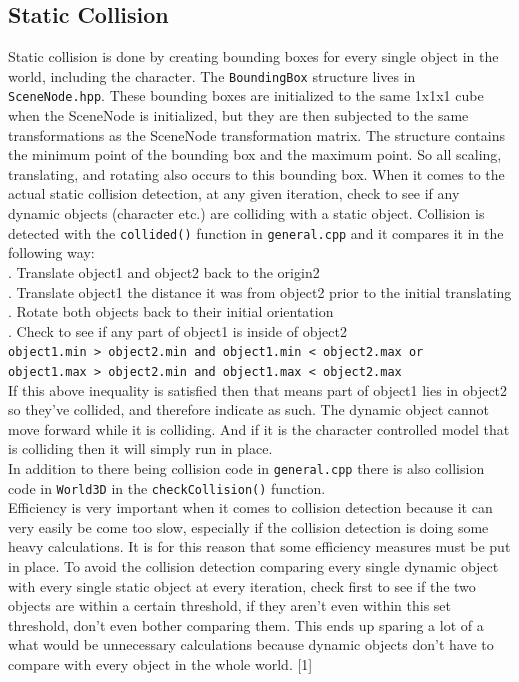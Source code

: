 \documentclass {article}
\begin{document}
\subsection{Static Collision}
Static collision is done by creating bounding boxes for every single object in the world, including the character. The \texttt{BoundingBox} structure lives in \texttt{SceneNode.hpp}. These bounding boxes are initialized to the same 1x1x1 cube when the SceneNode is initialized, but they are then subjected to the same transformations as the SceneNode transformation matrix. The structure contains the minimum point of the bounding box and the maximum point. So all scaling, translating, and rotating also occurs to this bounding box. When it comes to the actual static collision detection, at any given iteration, check to see if any dynamic objects (character etc.) are colliding with a static object. Collision is detected with the \texttt{collided()} function in \texttt{general.cpp} and it compares it in the following way:\\
. Translate object1 and object2 back to the origin2\\
. Translate object1 the distance it was from object2 prior to the initial translating\\
. Rotate both objects back to their initial orientation\\
. Check to see if any part of object1 is inside of object2\\ \newline
\indent \indent \texttt{object1.min > object2.min and object1.min < object2.max or}\\
\indent \indent \texttt{object1.max > object2.min and object1.max < object2.max}\\ \newline
If this above inequality is satisfied then that means part of object1 lies in object2 so they've collided, and therefore indicate as such. The dynamic object cannot move forward while it is colliding. And if it is the character controlled model that is colliding then it will simply run in place. \\ \newline
In addition to there being collision code in \texttt{general.cpp} there is also collision code in \texttt{World3D} in the \texttt{checkCollision()} function.\\ \newline
Efficiency is very important when it comes to collision detection because it can very easily be come too slow, especially if the collision detection is doing some heavy calculations. It is for this reason that some efficiency measures must be put in place. To avoid the collision detection comparing every single dynamic object with every single static object at every iteration, check first to see if the two objects are within a certain threshold, if they aren't even within this set threshold, don't even bother comparing them. This ends up sparing a lot of a what would be unnecessary calculations because dynamic objects don't have to compare with every object in the whole world. [1]
\newpage
\end{document}
